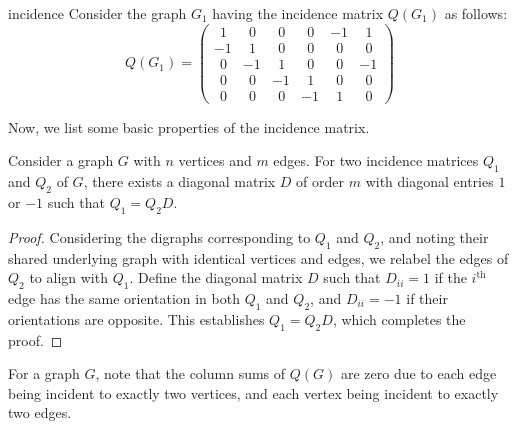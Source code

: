 \documentclass[../basic_graph_theory.tex]{subfiles}
\begin{document}
\begin{Eg}{}{incidence}
  Consider the graph $ G_1 $ having the incidence matrix $ Q(G_1) $ as follows:
  \[
    Q(G_1) = \begin{pmatrix}
      \ \ 1 & \ \ 0 & \ \ 0 & \ \ 0 & -1    & \ \ 1 \\
      -1    & \ \ 1 & \ \ 0 & \ \ 0 & \ \ 0 & \ \ 0 \\
      \ \ 0 & -1    & \ \ 1 & \ \ 0 & \ \ 0 & -1    \\
      \ \ 0 & \ \ 0 & -1    & \ \ 1 & \ \ 0 & \ \ 0 \\
      \ \ 0 & \ \ 0 & \ \ 0 & -1    & \ \ 1 & \ \ 0
    \end{pmatrix}
  \]
\end{Eg}

Now, we list some basic properties of the incidence matrix.
\begin{Thm}{}{}
  Consider a graph $G$ with $n$ vertices and $m$ edges. For two incidence matrices $ Q_1 $ and $ Q_2 $ of $ G $, there exists a diagonal matrix $ D $ of order \(m\) with diagonal entries \(1\) or \(-1\) such that $ Q_1 = Q_2 D $.
\end{Thm}
\begin{proof}
  Considering the digraphs corresponding to \(Q_1\) and \(Q_2\), and noting their shared underlying graph with identical vertices and edges, we relabel the edges of \(Q_2\) to align with \(Q_1\). Define the diagonal matrix \(D\) such that \(D_{ii} = 1\) if the \(i^{\text{th}}\) edge has the same orientation in both \(Q_1\) and \(Q_2\), and \(D_{ii} = -1\) if their orientations are opposite. This establishes \(Q_1 = Q_2 D\), which completes the proof.
\end{proof}

For a graph \(G\), note that the column sums of \(Q(G)\) are zero due to each edge being incident to exactly two vertices, and each vertex being incident to exactly two edges.
\end{document}
